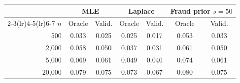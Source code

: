 \begin{tabular}{rcccccc}\toprule
 & \multicolumn{2}{c}{MLE} & \multicolumn{2}{c}{Laplace} & \multicolumn{2}{c}{Fraud prior $s=50$}\\\cmidrule(lr){2-3}\cmidrule(lr){4-5}\cmidrule(lr){6-7}
$n$ & Oracle & Valid. & Oracle & Valid. & Oracle & Valid.\\\midrule
500 & 0.033 & 0.025 & 0.025 & 0.017 & 0.053 & 0.033\\
2,000 & 0.058 & 0.050 & 0.037 & 0.031 & 0.061 & 0.050\\
5,000 & 0.069 & 0.061 & 0.049 & 0.040 & 0.074 & 0.061\\
20,000 & 0.079 & 0.075 & 0.073 & 0.067 & 0.080 & 0.075\\
\bottomrule\end{tabular}
